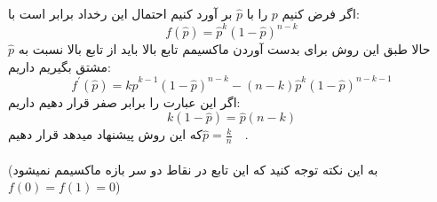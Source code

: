 \problem{}
اگر فرض کنیم $p$
را با $\hat{p}$
بر آورد کنیم احتمال این رخداد برابر است با:\\
\[
    f(\hat{p}) = \hat{p}^k (1-\hat{p})^{n-k}
\]
حالا طبق این روش برای بدست آوردن ماکسیمم تابع بالا
 باید از تابع بالا نسبت به $\hat{p}$
مشتق بگیریم داریم:\\
\[
    f^{\prime}(\hat{p}) =  k\hat{p}^{k-1}(1-\hat{p})^{n-k} - (n-k)\hat{p}^k(1-\hat{p})^{n-k-1}
\]
اگر این عبارت را برابر صفر قرار دهیم داریم:\\
\[
    k(1-\hat{p}) =\hat{p}(n-k)
\]
که این روش پیشنهاد میدهد قرار دهیم$\hat{p} = \frac{k}{n} \quad$.\\\\
(به این نکته توجه کنید که این تابع در نقاط دو سر بازه
ماکسیمم نمیشود $f(0) = f(1) = 0$)